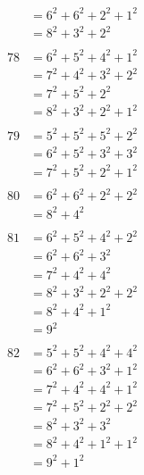 \documentclass{article}
\numberwithin{equation}{section}
\begin{document}
\begin{multicols}{3}
\begin{align*}
   & = 6^2 + 6^2 + 2^2 + 1^2\\
   & = 8^2 + 3^2 + 2^2\\
\\
78 & = 6^2 + 5^2 + 4^2 + 1^2\\
   & = 7^2 + 4^2 + 3^2 + 2^2\\
   & = 7^2 + 5^2 + 2^2\\
   & = 8^2 + 3^2 + 2^2 + 1^2\\
\\
79 & = 5^2 + 5^2 + 5^2 + 2^2\\
   & = 6^2 + 5^2 + 3^2 + 3^2\\
   & = 7^2 + 5^2 + 2^2 + 1^2\\
\\
80 & = 6^2 + 6^2 + 2^2 + 2^2\\
   & = 8^2 + 4^2\\
\\
81 & = 6^2 + 5^2 + 4^2 + 2^2\\
   & = 6^2 + 6^2 + 3^2\\
   & = 7^2 + 4^2 + 4^2\\
   & = 8^2 + 3^2 + 2^2 + 2^2\\
   & = 8^2 + 4^2 + 1^2\\
   & = 9^2\\
\\
82 & = 5^2 + 5^2 + 4^2 + 4^2\\
   & = 6^2 + 6^2 + 3^2 + 1^2\\
   & = 7^2 + 4^2 + 4^2 + 1^2\\
   & = 7^2 + 5^2 + 2^2 + 2^2\\
   & = 8^2 + 3^2 + 3^2\\
   & = 8^2 + 4^2 + 1^2 + 1^2\\
   & = 9^2 + 1^2\\
\end{align*}
\end{multicols}

\pagebreak
\end{document}
